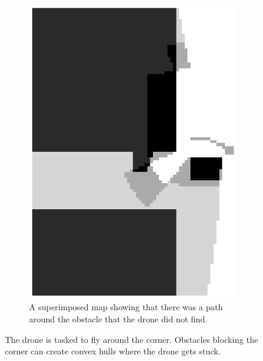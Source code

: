 \begin{figure}
\begin{subfigure}[t]{0.3\textwidth}
\includegraphics[width=\textwidth]{Figures/convex_corner/superimposed_obstacles_map.eps}
\caption{A superimposed map showing that there was a path around the obstacle that the drone did not find. }
\label{fig:convex_corner3}
\end{subfigure}
\caption{The drone is tasked to fly around the corner. Obstacles blocking the corner can create convex hulls where the drone gets stuck.}
\label{fig:convex_corner}
\end{figure}

